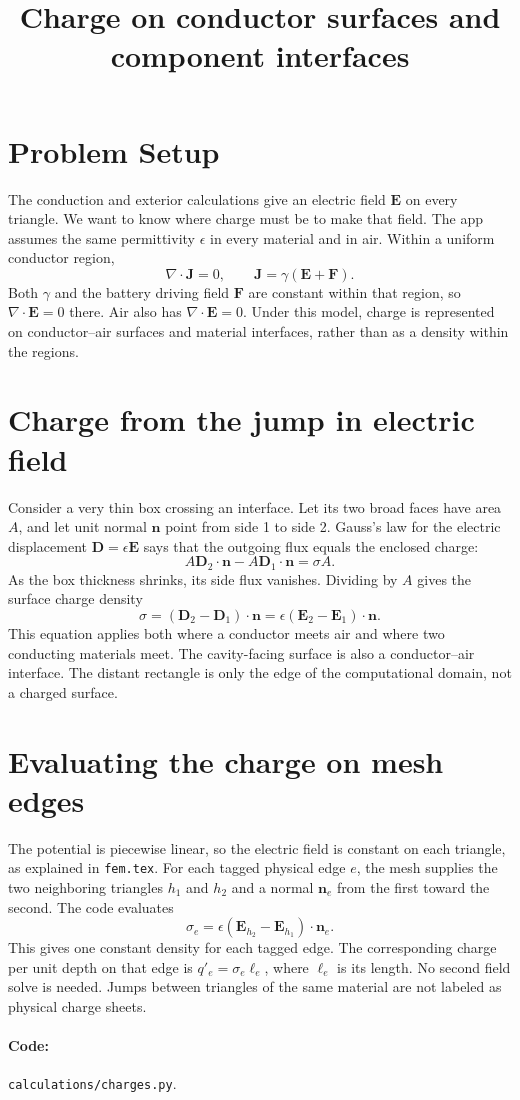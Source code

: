 \documentclass[11pt]{article}
\title{Charge on conductor surfaces and component interfaces}
\author{}
\date{}
\begin{document}
\maketitle

\section{Problem Setup}
The conduction and exterior calculations give an electric field
$\bm E$ on every triangle. We want to know where charge must be to
make that field. The app assumes the same permittivity $\epsilon$
in every material and in air. Within a uniform conductor region,
\begin{equation}
 \nabla\cdot\bm J=0,\qquad
 \bm J=\gamma(\bm E+\bm F).
\end{equation}
Both $\gamma$ and the battery driving field $\bm F$ are constant within
that region, so $\nabla\cdot\bm E=0$ there. Air also has
$\nabla\cdot\bm E=0$. Under this model, charge is represented on
conductor--air surfaces and material interfaces, rather than as
a density within the regions.

\section{Charge from the jump in electric field}
Consider a very thin box crossing an interface. Let its two broad
faces have area $A$, and let unit normal $\bm n$ point from side 1
to side 2. Gauss's law for the electric displacement
$\bm D=\epsilon\bm E$ says that the outgoing flux equals the
enclosed charge:
\begin{equation}
 A\bm D_2\cdot\bm n-A\bm D_1\cdot\bm n=\sigma A.
\end{equation}
As the box thickness shrinks, its side flux vanishes. Dividing by
$A$ gives the surface charge density
\begin{equation}
 \sigma=(\bm D_2-\bm D_1)\cdot\bm n
       =\epsilon(\bm E_2-\bm E_1)\cdot\bm n.
 \label{eq:jump}
\end{equation}
This equation applies both where a conductor meets air and where
two conducting materials meet. The cavity-facing surface is also
a conductor--air interface. The distant rectangle is only the
edge of the computational domain, not a charged surface.

\section{Evaluating the charge on mesh edges}
The potential is piecewise linear, so the electric field is
constant on each triangle, as explained in \texttt{fem.tex}.
For each tagged physical edge $e$, the mesh supplies the two
neighboring triangles $h_1$ and $h_2$ and a normal $\bm n_e$
from the first toward the second. The code evaluates
\begin{equation}
 \sigma_e
 =\epsilon(\bm E_{h_2}-\bm E_{h_1})\cdot\bm n_e.
\end{equation}
This gives one constant density for each tagged edge. The
corresponding charge per unit depth on that edge is
$q'_e=\sigma_e\ell_e$, where $\ell_e$ is its length.
No second field solve is needed. Jumps between triangles of
the same material are not labeled as physical charge sheets.

\paragraph{Code:} \texttt{calculations/charges.py}.
\end{document}
